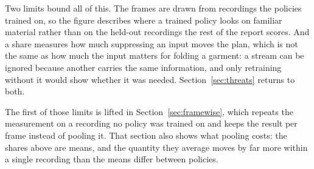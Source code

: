 Two limits bound all of this. The frames are drawn from recordings the policies
trained on, so the figure describes where a trained policy looks on familiar
material rather than on the held-out recordings the rest of the report scores.
And a share measures how much suppressing an input moves the plan, which is not
the same as how much the input matters for folding a garment: a stream can be
ignored because another carries the same information, and only retraining
without it would show whether it was needed. Section~\ref{sec:threats} returns
to both.

The first of those limits is lifted in Section~\ref{sec:framewise}, which repeats
the measurement on a recording no policy was trained on and keeps the result per
frame instead of pooling it. That section also shows what pooling costs: the
shares above are means, and the quantity they average moves by far more within a
single recording than the means differ between policies.
